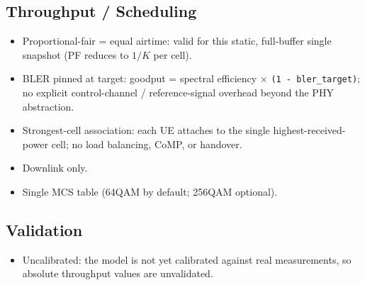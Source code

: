 \documentclass[11pt]{article}
\begin{document}
\subsection{Throughput / Scheduling}
\begin{itemize}[leftmargin=*]
  \item Proportional-fair = equal airtime: valid for this static, full-buffer single
  snapshot (PF reduces to $1/K$ per cell).
  \item BLER pinned at target: goodput = spectral efficiency $\times$
  \texttt{(1 - bler_target)}; no explicit control-channel / reference-signal overhead
  beyond the PHY abstraction.
  \item Strongest-cell association: each UE attaches to the single highest-received-
  power cell; no load balancing, CoMP, or handover.
  \item Downlink only.
  \item Single MCS table (64QAM by default; 256QAM optional).
\end{itemize}

\subsection{Validation}
\begin{itemize}[leftmargin=*]
  \item Uncalibrated: the model is not yet calibrated against real measurements, so
  absolute throughput values are unvalidated.
\end{itemize}
\end{document}
